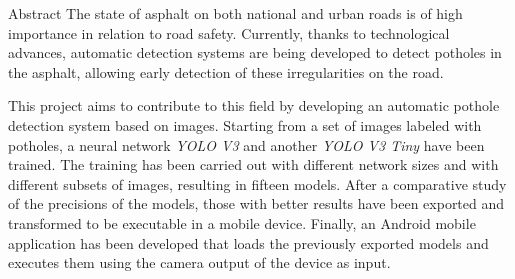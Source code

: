 \begin{poliabstract}{Abstract}
\noindent
The state of asphalt on both national and urban roads is of high importance in relation to road safety. Currently, thanks to technological advances, automatic detection systems are being developed to detect potholes in the asphalt, allowing early detection of these irregularities on the road.

\doublespacing\singlespacing
\noindent
This project aims to contribute to this field by developing an automatic pothole detection system based on images. Starting from a set of images labeled with potholes, a neural network \textit{YOLO V3} and another \textit{YOLO V3 Tiny} have been trained. The training has been carried out with different network sizes and with different subsets of images, resulting in fifteen models. After a comparative study of the precisions of the models, those with better results have been exported and transformed to be executable in a mobile device. Finally, an Android mobile application has been developed that loads the previously exported models and executes them using the camera output of the device as input.
\end{poliabstract}